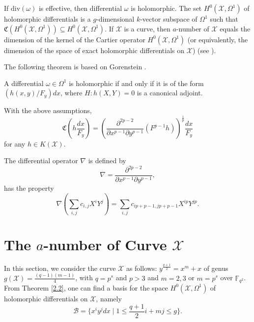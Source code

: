 If $\mbox{div}(\omega)$ is effective, then differential $\omega$ is holomorphic. The set $H^0(\mathcal{X}, \Omega ^1)$ of holomorphic differentials is a $g$-dimensional $k$-vector subspace of $\Omega^1$ such that $\mathfrak{C}(H^0(\mathcal{X}, \Omega^1)) \subseteq H^0(\mathcal{X}, \Omega^1)$. If $\mathcal{X}$ is a curve, then $a$-number of $\mathcal{X}$ equals the dimension of the kernel of the Cartier operator $H^0(\mathcal{X}, \Omega^1)$ (or equivalently, the dimension of the space of exact holomorphic differentials on $\mathcal{X}$) (see \cite[5.2.8]{14}).









The following theorem is based on Gorenstein \cite[Theorem 12]{9}.
\begin{theorem}\label{2.2}
  A differential $\omega \in \Omega^1$ is holomorphic if and only if it is of the form $(h(x, y)/F_y)dx$, where $H:h(X, Y) =0$ is a canonical adjoint.
\end{theorem}

\begin{theorem}\cite{maria}\label{2.3}
  With the above assumptions,
\begin{equation*}
\mathfrak{C}(h\dfrac{dx}{F_{y}}) = (\dfrac{\partial^{2p-2}}{\partial x^{p-1}\partial y^{p-1}}(F^{p-1}h))^{\frac{1}{p}}\dfrac{dx}{F_{y}}
\end{equation*}
for any $h \in K(\mathcal{X})$.
\end{theorem}


The differential operator $\nabla$ is defined by
$$\nabla = \dfrac{\partial^{2p-2}}{\partial x^{p-1} \partial y^{p-1}},$$
has the property
\begin{equation}\label{123321}
  \nabla(\sum_{i,j} c_{i,j}X^iY^j)= \sum_{i,j} c_{ip+p-1,jp+p-1}X^{ip}Y^{jp}.
\end{equation}

\section{The $a$-number of Curve $\mathcal{X}$}\label{202}

In this section, we consider the curve $\mathcal{X}$ as follows: $y^{\frac{q+1}{2}}=x^{m}+x$ of genus $g(\mathcal{X})= \frac{(q-1)(m-1)}{4}$, with $q=p^s$ and $p>3$ and $m=2, 3$ or $m=p^s$ over $\mathbb{F}_{q^2}$. From Theorem \ref{2.2}, one can find a basis for the space $H^0(\mathcal{X}, \Omega^1)$ of holomorphic differentials on $\mathcal{X}$, namely
$$\mathcal{B} = \{ x^iy^jdx \mid 1 \leq \frac{q+1}{2}i+ mj \leq g \}.$$


